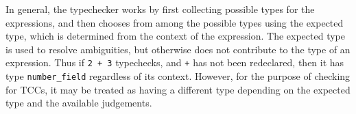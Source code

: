 In general, the typechecker works by first collecting possible types for
the expressions, and then chooses from among the possible types using the
expected type, which is determined from the context of the expression.
The expected type is used to resolve ambiguities, but otherwise does not
contribute to the type of an expression.  Thus if \texttt{2 + 3}
typechecks, and \texttt{+} has not been redeclared, then it has type
\texttt{number\_field} regardless of its context.  However, for the purpose
of checking for TCCs, it may be treated as having a different type
depending on the expected type and the available judgements.

